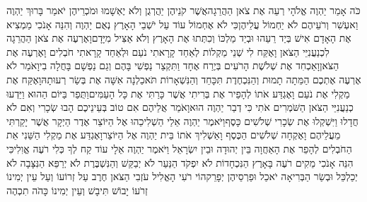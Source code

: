 \documentclass[../main/main.tex]{subfiles}
\begin{document}
\begin{multicols*}{\ncols}
כֹּה אָמַר יַהְוֶה אֱלֹהָי רְעֵה אֶת צֹאן הַהֲרֵגָה\PreVerseSpace{}אֲשֶׁר קֹנֵיהֶן יַהֲרְגֻן וְלֹא יֶאְשָׁמוּ וּמֹכְרֵיהֶן יֹאמַר בָּרוּךְ יַהְוֶה וַאעְשִׁר וְרֹעֵיהֶם לֹא יַחְמוֹל עֲלֵיהֶן\PreVerseSpace{}כִּי לֹא אֶחְמוֹל עוֹד עַל יֹשְׁבֵי הָאָרֶץ נְאֻם יַהְוֶה וְהִנֵּה אָנֹכִי מַמְצִיא אֶת הָאָדָם אִישׁ בְּיַד רֵעֵהוּ וּבְיַד מַלְכּוֹ וְכִתְּתוּ אֶת הָאָרֶץ וְלֹא אַצִּיל מִיָּדָם\PreVerseSpace{}וָאֶרְעֶה אֶת צֹאן הַהֲרֵגָה לִכְנַעֲנִיֵּי\SubEnd{} הַצֹּאן וָאֶקַּח לִי שְׁנֵי מַקְלוֹת לְאַחַד קָרָאתִי נֹעַם וּלְאַחַד קָרָאתִי חֹבְלִים וָאֶרְעֶה אֶת הַצֹּאן\PreVerseSpace{}וָאַכְחִד אֶת שְׁלֹשֶׁת הָרֹעִים בְּיֶרַח אֶחָד וַתִּקְצַר נַפְשִׁי בָּהֶם וְגַם נַפְשָׁם בָּחֲלָה בִי\PreVerseSpace{}וָאֹמַר לֹא אֶרְעֶה אֶתְכֶם הַמֵּתָה תָמוּת וְהַנִּכְחֶדֶת תִּכָּחֵד וְהַנִּשְׁאָרוֹת תֹּאכַלְנָה אִשָּׁה אֶת בְּשַׂר רְעוּתָהּ\PreVerseSpace{}וָאֶקַּח אֶת מַקְלִי אֶת נֹעַם וָאֶגְדַּע אֹתוֹ לְהָפֵיר אֶת בְּרִיתִי אֲשֶׁר כָּרַתִּי אֶת כָּל הָעַמִּים\PreVerseSpace{}וַתֻּפַר בַּיּוֹם הַהוּא וַיֵּדְעוּ כְנַעֲנִיֵּי\SubEnd{} הַצֹּאן הַשֹּׁמְרִים אֹתִי כִּי דְבַר יַהְוֶה הוּא\PreVerseSpace{}וָאֹמַר אֲלֵיהֶם אִם טוֹב בְּעֵינֵיכֶם הָבוּ שְׂכָרִי וְאִם לֹא חֲדָלוּ וַיִּשְׁקְלוּ אֶת שְׂכָרִי שְׁלֹשִׁים כָּסֶף\PreVerseSpace{}וַיֹּאמֶר יַהְוֶה אֵלַי הַשְׁלִיכֵהוּ אֶל הַיּוֹצֵר אֶדֶר הַיְקָר אֲשֶׁר יָקַרְתִּי מֵעֲלֵיהֶם וָאֶקְחָה שְׁלֹשִׁים הַכֶּסֶף וָאַשְׁלִיךְ אֹתוֹ בֵּית יַהְוֶה אֶל הַיּוֹצֵר\PreVerseSpace{}וָאֶגְדַּע אֶת מַקְלִי הַשֵּׁנִי אֵת הַחֹבְלִים לְהָפֵר אֶת הָאַחֲוָה בֵּין יְהוּדָה וּבֵין יִשְׂרָאֵל \ClosedSection{}וַיֹּאמֶר יַהְוֶה אֵלָי עוֹד קַח לְךָ כְּלִי רֹעֶה אֱוִלִי\PreVerseSpace{}כִּי הִנֵּה אָנֹכִי מֵקִים רֹעֶה בָּאָרֶץ הַנִּכְחָדוֹת לֹא יִפְקֹד הַנַּעַר לֹא יְבַקֵּשׁ וְהַנִּשְׁבֶּרֶת לֹא יְרַפֵּא הַנִּצָּבָה לֹא יְכַלְכֵּל וּבְשַׂר הַבְּרִיאָה יֹאכַל וּפַרְסֵיהֶן יְפָרֵק\PreVerseSpace{}הוֹי רֹעִי הָאֱלִיל עֹזְבִי הַצֹּאן חֶרֶב עַל זְרוֹעוֹ וְעַל עֵין יְמִינוֹ זְרֹעוֹ יָבוֹשׁ תִּיבָשׁ וְעֵין יְמִינוֹ כָּהֹה תִכְהֶה\OpenSection{}\par

\end{multicols*}
\end{document}
